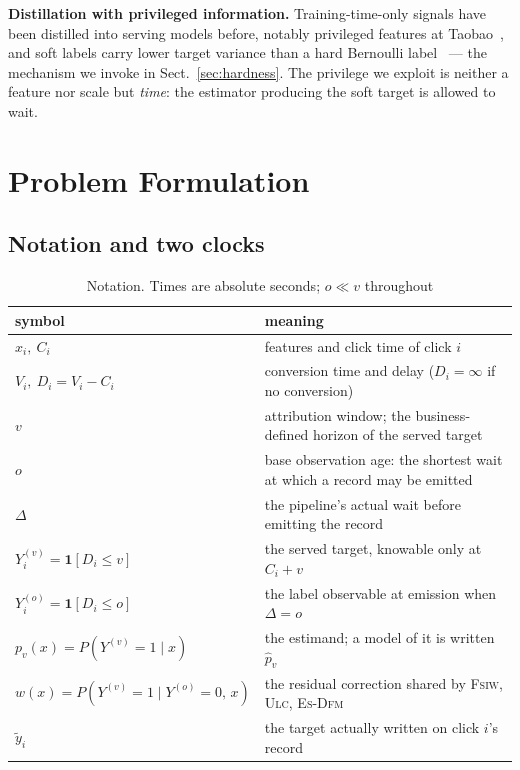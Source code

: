 \documentclass[runningheads]{llncs}
\newcommand{\ind}{\mathbf{1}}
\newcommand{\Yo}{Y^{(o)}}
\newcommand{\Yv}{Y^{(v)}}
\begin{document}
\smallskip\noindent\textbf{Distillation with privileged information.} Training-time-only signals
have been distilled into serving models before, notably privileged features at
Taobao~\cite{xu2020privileged}, and soft labels carry lower target variance than a hard Bernoulli
label~\cite{menon2021statistical} --- the mechanism we invoke in Sect.~\ref{sec:hardness}. The
privilege we exploit is neither a feature nor scale but \emph{time}: the estimator producing the
soft target is allowed to wait.

\section{Problem Formulation}\label{sec:formulation}

\subsection{Notation and two clocks}

\begin{table}[t]
\caption{Notation. Times are absolute seconds; $o \ll v$ throughout}
\label{tab:notation}
\centering\small
\begin{tabular}{l l}
\toprule
symbol & meaning\\
\midrule
$x_i,\ C_i$ & features and click time of click $i$\\
$V_i,\ D_i = V_i - C_i$ & conversion time and delay ($D_i = \infty$ if no conversion)\\
$v$ & attribution window; the business-defined horizon of the served target\\
$o$ & base observation age: the shortest wait at which a record may be emitted\\
$\Delta$ & the pipeline's actual wait before emitting the record\\
$\Yv_i = \ind[D_i \le v]$ & the served target, knowable only at $C_i + v$\\
$\Yo_i = \ind[D_i \le o]$ & the label observable at emission when $\Delta = o$\\
$p_v(x) = P(\Yv{=}1 \mid x)$ & the estimand; a model of it is written $\hat p_v$\\
$w(x) = P(\Yv{=}1 \mid \Yo{=}0,\, x)$ & the residual correction shared by \textsc{Fsiw},
\textsc{Ulc}, \textsc{Es-Dfm}\\
$\tilde y_i$ & the target actually written on click $i$'s record\\
\bottomrule
\end{tabular}
\end{table}
\end{document}
